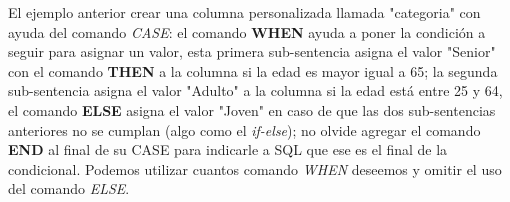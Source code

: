 El ejemplo anterior crear una columna personalizada llamada "categoria" con ayuda del comando \textit{CASE}: el comando \textbf{WHEN} ayuda a poner la condición a seguir para asignar un valor, esta primera sub-sentencia asigna el valor "Senior" con el comando \textbf{THEN} a la columna si la edad es mayor igual a 65; la segunda sub-sentencia asigna el valor "Adulto" a la columna si la edad está entre 25 y 64, el comando \textbf{ELSE} asigna el valor "Joven" en caso de que las dos sub-sentencias anteriores no se cumplan (algo como el \textit{if-else}); no olvide agregar el comando \textbf{END} al final de su CASE para indicarle a SQL que ese es el final de la condicional. Podemos utilizar cuantos comando \textit{WHEN} deseemos y omitir el uso del comando \textit{ELSE}.
